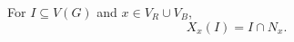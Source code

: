\begin{definition}
For \(I\subseteq V(G)\) and \(x\in V_R\cup V_B\),
\[
X_x(I)=I\cap N_x.
\]
\end{definition}
